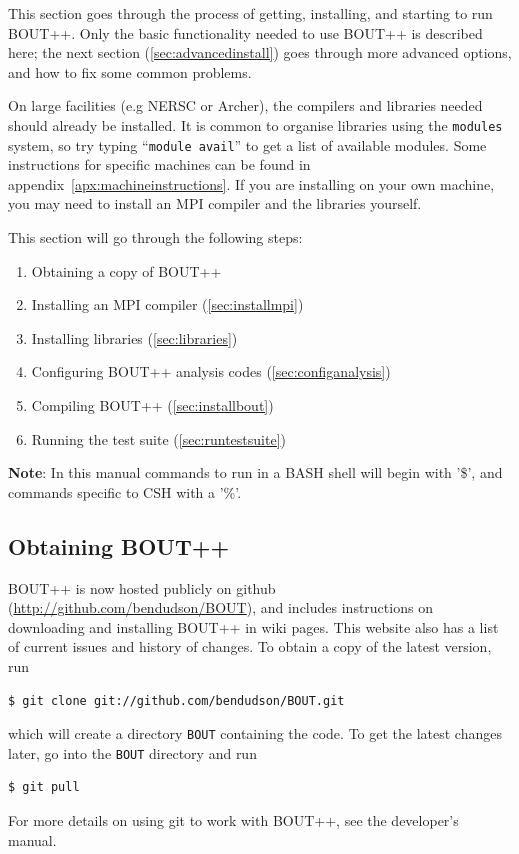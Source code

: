 \documentclass[12pt]{article}
\begin{document}
This section goes through the process of getting, installing, and
starting to run BOUT++. Only the basic functionality needed to use BOUT++
is described here; the next section (\ref{sec:advancedinstall}) goes through
more advanced options, and how to fix some common problems.

On large facilities (e.g NERSC or Archer), the compilers and libraries
needed should already be installed. It is common to organise libraries
using the \texttt{modules} system, so try typing ``\texttt{module avail}'' to
get a list of available modules. Some instructions for specific machines
can be found in appendix~\ref{apx:machineinstructions}.
If you are installing on your own machine, you may need to install an MPI compiler
and the libraries yourself.

This section will go through the following steps:
\begin{enumerate}
\item Obtaining a copy of BOUT++
\item Installing an MPI compiler (\ref{sec:installmpi})
\item Installing libraries (\ref{sec:libraries})
\item Configuring BOUT++ analysis codes (\ref{sec:configanalysis})
\item Compiling BOUT++ (\ref{sec:installbout})
\item Running the test suite (\ref{sec:runtestsuite})
\end{enumerate}

{\bf Note}: In this manual commands to run in a BASH shell will begin with '\$', and commands specific to CSH with a '\%'.

\subsection{Obtaining BOUT++}

BOUT++ is now hosted publicly on github (\url{http://github.com/bendudson/BOUT}), and includes
instructions on downloading and installing BOUT++ in wiki pages. This website also has a list of current  issues
and history of changes. To obtain a copy of the latest version, run 
\begin{verbatim}
$ git clone git://github.com/bendudson/BOUT.git
\end{verbatim}
which will create a directory \texttt{BOUT} containing the code. To get the latest changes later,
go into the  \texttt{BOUT} directory and run
\begin{verbatim}
$ git pull
\end{verbatim}
For more details on using git to work with BOUT++, see the developer's manual.
\end{document}
